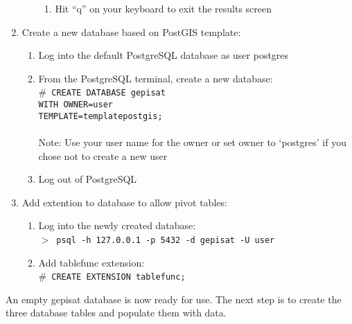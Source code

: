 \begin{enumerate}
\begin{enumerate}
\begin{enumerate}
            \item Hit ``q'' on your keyboard to exit the results screen
        \end{enumerate}
    \end{enumerate}
    \item Create a new database based on PostGIS template:
    \begin{enumerate}
        \item Log into the default PostgreSQL database as user postgres
        \item From the PostgreSQL terminal, create a new database:\\
              $\#$~\texttt{CREATE DATABASE gepisat\\ 
              WITH OWNER=user\\ 
              TEMPLATE=template\textunderscore postgis;}\\
              \\
              Note: Use your user name for the owner or set owner to 
              `postgres' if you chose not to create a new user
        \item Log out of PostgreSQL
    \end{enumerate}
    \item Add extention to database to allow pivot tables:
    \begin{enumerate}
        \item Log into the newly created database:\\
              $>$~\texttt{psql -h 127.0.0.1 -p 5432 -d gepisat -U user}
        \item Add tablefunc extension:\\
              $\#$~\texttt{CREATE EXTENSION tablefunc;}
    \end{enumerate}
\end{enumerate}

An empty gepisat database is now ready for use.  
The next step is to create the three database tables and populate them with data.
